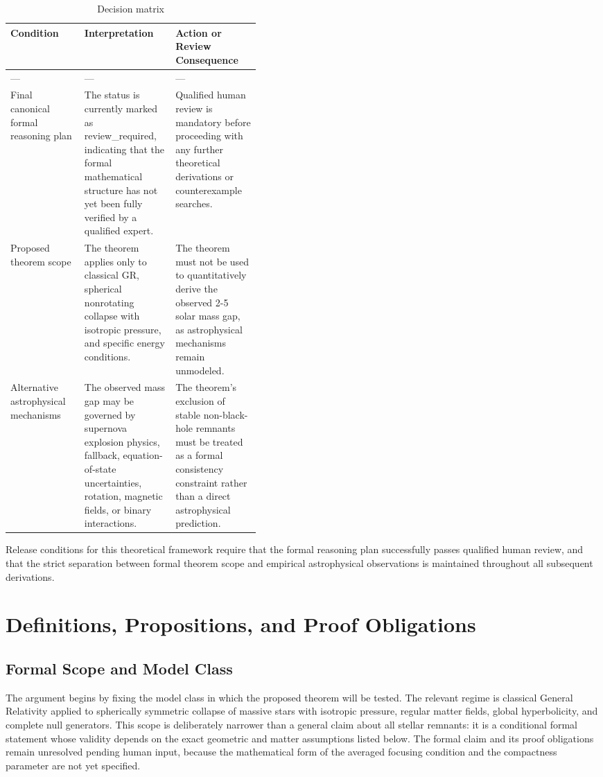 \documentclass[conference]{IEEEtran}
\begin{document}
\begin{table}[htbp]
\centering
\small
\caption{Decision matrix}
\label{tab:risk-limitations-and-review-risk-limitations-and-review-table}
\begin{tabular}{|p{0.14\linewidth}|p{0.14\linewidth}|p{0.14\linewidth}|}
\hline
Condition & Interpretation & Action or Review Consequence \\\hline
--- & --- & --- \\\hline
Final canonical formal reasoning plan & The status is currently marked as review\_required, indicating that the formal mathematical structure has not yet been fully verified by a qualified expert. & Qualified human review is mandatory before proceeding with any further theoretical derivations or counterexample searches. \\\hline
Proposed theorem scope & The theorem applies only to classical GR, spherical nonrotating collapse with isotropic pressure, and specific energy conditions. & The theorem must not be used to quantitatively derive the observed 2-5 solar mass gap, as astrophysical mechanisms remain unmodeled. \\\hline
Alternative astrophysical mechanisms & The observed mass gap may be governed by supernova explosion physics, fallback, equation-of-state uncertainties, rotation, magnetic fields, or binary interactions. & The theorem's exclusion of stable non-black-hole remnants must be treated as a formal consistency constraint rather than a direct astrophysical prediction. \\\hline
\end{tabular}
\end{table}

Release conditions for this theoretical framework require that the formal reasoning plan successfully passes qualified human review, and that the strict separation between formal theorem scope and empirical astrophysical observations is maintained throughout all subsequent derivations.

\section{Definitions, Propositions, and Proof Obligations}
\subsection{Formal Scope and Model Class}
The argument begins by fixing the model class in which the proposed theorem will be tested. The relevant regime is classical General Relativity applied to spherically symmetric collapse of massive stars with isotropic pressure, regular matter fields, global hyperbolicity, and complete null generators. This scope is deliberately narrower than a general claim about all stellar remnants: it is a conditional formal statement whose validity depends on the exact geometric and matter assumptions listed below. The formal claim and its proof obligations remain unresolved pending human input, because the mathematical form of the averaged focusing condition and the compactness parameter are not yet specified.
\end{document}
